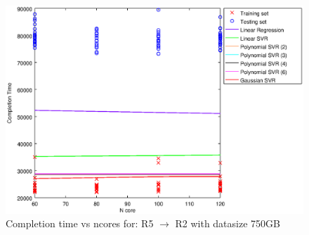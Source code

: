
\begin {figure}[hbtp]
\centering
\includegraphics[width=\textwidth]{output/R5_R2_750_ALL_FEATURES/plot_R5_R2_750.eps}
\caption{Completion time vs ncores for: R5 $\rightarrow$ R2 with datasize 750GB}
\label{fig:coreonly_linear_R5_R2_750}
\end {figure}
